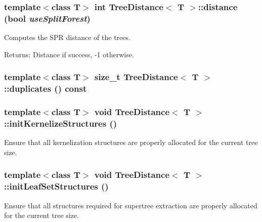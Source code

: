 \subsubsection{\setlength{\rightskip}{0pt plus 5cm}template$<$class T$>$ int {\bf Tree\-Distance}$<$ T $>$::distance (bool {\em use\-Split\-Forest})}\label{classTreeDistance_a8}


Computes the SPR distance of the trees. 

\begin{Desc}
\item[Returns:]Distance if success, -1 otherwise. \end{Desc}
\subsubsection{\setlength{\rightskip}{0pt plus 5cm}template$<$class T$>$ size\_\-t {\bf Tree\-Distance}$<$ T $>$::duplicates () const}\label{classTreeDistance_a12}


\subsubsection{\setlength{\rightskip}{0pt plus 5cm}template$<$class T$>$ void {\bf Tree\-Distance}$<$ T $>$::init\-Kernelize\-Structures ()\hspace{0.3cm}{\tt  [protected]}}\label{classTreeDistance_b0}


Ensure that all kernelization structures are properly allocated for the current tree size. 

\subsubsection{\setlength{\rightskip}{0pt plus 5cm}template$<$class T$>$ void {\bf Tree\-Distance}$<$ T $>$::init\-Leaf\-Set\-Structures ()\hspace{0.3cm}{\tt  [protected]}}\label{classTreeDistance_b2}


Ensure that all structures required for supertree extraction are properly allocated for the current tree size. 

